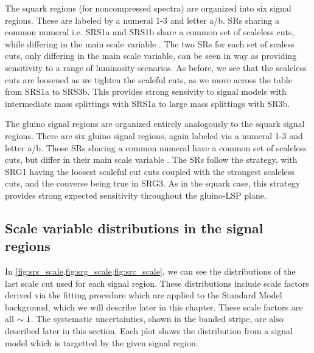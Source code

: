 The squark regions (for noncompressed spectra) are organized into six signal regions.
These are labeled by a numeral 1-3 and letter a/b.
SRs sharing a common numeral i.e. SRS1a and SRS1b share a common set of scaleless cuts, while differing in the main scale variable .
The two SRs for each set of scaless cuts, only differing in the main scale variable, can be seen in  way as providing sensitivity to a range of luminosity scenarios\footnotemark.
As before, we see that the scaleless cuts are loosened as we tighten the scaleful cuts, as we move across the table from SRS1a to SRS3b.
This provides strong sensivity to signal models with intermediate mass splittings with SRS1a to large mass splittings with SR3b.

The gluino signal regions are organized entirely analogously to the squark signal regions.
There are six gluino signal regions, again labeled via a numeral 1-3 and letter a/b.
Those SRs sharing a common numeral have a common set of scaleless cuts, but differ in their main scale variable .
The SRs follow the strategy, with SRG1 having the loosest scaleful cut cuts coupled with the strongest scaleless cuts, and the converse being true in SRG3.
As in the squark case, this strategy provides strong expected sensitivity throughout the gluino-LSP plane.



\subsection{Scale variable distributions in the signal regions}

In \ref{fig:srs_scale,fig:srg_scale,fig:src_scale}, we can see the distributions of the last scale cut used for each signal region.
These distributions include scale factors derived via the fitting procedure which are applied to the Standard Model background, which we will describe later in this chapter.
These scale factors are all $\sim 1$.
The systematic uncertainties, shown in the banded stripe, are also described later in this section.
Each plot shows the distribution from a signal model which is targetted by the given signal region.


